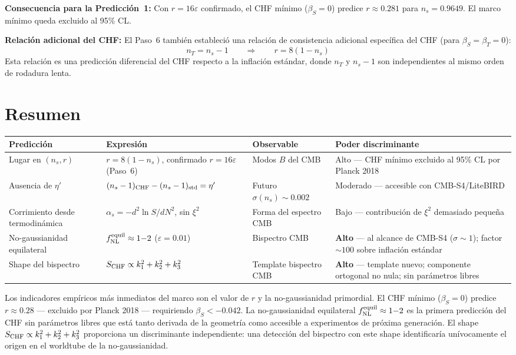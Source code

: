 \documentclass[12pt,a4paper]{article}
\begin{document}
\textbf{Consecuencia para la Predicción~1:} Con $r = 16\varepsilon$ confirmado, el CHF mínimo ($\beta_S = 0$) predice $r \approx 0.281$ para $n_s = 0.9649$. El marco mínimo queda excluido al 95\% CL.

\textbf{Relación adicional del CHF:} El Paso~6 también estableció una relación de consistencia adicional específica del CHF (para $\beta_S = \beta_T = 0$):
\begin{equation}
n_T = n_s - 1 \qquad \Longrightarrow \qquad r = 8(1 - n_s) \tag{19}
\end{equation}
Esta relación es una predicción diferencial del CHF respecto a la inflación estándar, donde $n_T$ y $n_s - 1$ son independientes al mismo orden de rodadura lenta.

\section{Resumen}

\begin{table}[h]
\centering
\small
\begin{tabular}{@{}lp{3.2cm}p{2.3cm}p{4cm}@{}}
\toprule
Predicción & Expresión & Observable & Poder discriminante \\
\midrule
Lugar en $(n_s, r)$ & $r = 8(1-n_s)$, confirmado $r=16\varepsilon$ (Paso~6) & Modos $B$ del CMB & Alto --- CHF mínimo excluido al 95\% CL por Planck 2018 \\[4pt]
Ausencia de $\eta'$ & $(n_s - 1)_{\rm CHF} - (n_s-1)_{\rm std} = \eta'$ & Futuro $\sigma(n_s) \sim 0.002$ & Moderado --- accesible con CMB-S4/LiteBIRD \\[4pt]
Corrimiento desde termodinámica & $\alpha_s = -d^2\ln S/dN^2$, sin $\xi^2$ & Forma del espectro CMB & Bajo --- contribución de $\xi^2$ demasiado pequeña \\[4pt]
No-gaussianidad equilateral & $f_{\rm NL}^{\rm equil} \approx 1{-}2$ ($\varepsilon=0.01$) & Bispectro CMB & \textbf{Alto} --- al alcance de CMB-S4 ($\sigma\sim 1$); factor $\sim 100$ sobre inflación estándar \\[4pt]
Shape del bispectro & $S_{\rm CHF}\propto k_1^2+k_2^2+k_3^2$ & Template bispectro CMB & \textbf{Alto} --- template nuevo; componente ortogonal no nula; sin parámetros libres \\
\bottomrule
\end{tabular}
\end{table}

Los indicadores empíricos más inmediatos del marco son el valor de $r$ y la no-gaussianidad primordial. El CHF mínimo ($\beta_S = 0$) predice $r \approx 0.28$ --- excluido por Planck 2018 --- requiriendo $\beta_S < -0.042$. La no-gaussianidad equilateral $f_{\rm NL}^{\rm equil}\approx 1{-}2$ es la primera predicción del CHF sin parámetros libres que está tanto derivada de la geometría como accesible a experimentos de próxima generación. El shape $S_{\rm CHF}\propto k_1^2+k_2^2+k_3^2$ proporciona un discriminante independiente: una detección del bispectro con este shape identificaría unívocamente el origen en el worldtube de la no-gaussianidad.
\end{document}
